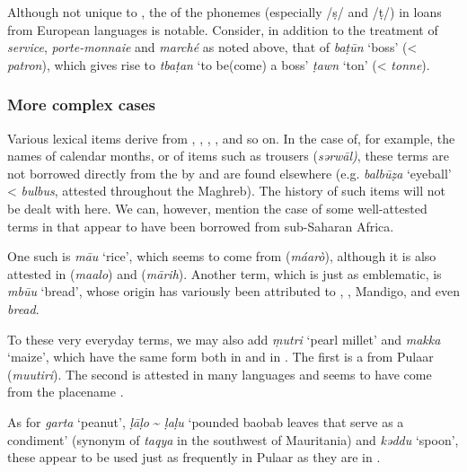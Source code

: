 \documentclass[output=paper]{langsci/langscibook}
\begin{document}
Although not unique to , the  of the  phonemes (especially /ṣ/ and /ṭ/) in loans from European languages is notable. Consider, in addition to the treatment of \textit{service}, \textit{porte-monnaie} and \textit{marché} as noted above, that of \textit{baṭ{\R}ūn} ‘boss’ (< \textit{patron}), which gives rise to \textit{tbaṭ{\R}an} ‘to be(come) a boss’ \textit{ṭawn} ‘ton’ (< \textit{tonne}).

\subsubsection{More complex cases} %

 \label{wander}

Various  lexical items derive from , , , , and so on. In the case of, for example, the names of calendar months, or of items such as trousers (\textit{sərwāl)}, these terms are not borrowed directly from the  by  and are found elsewhere (e.g. \textit{balbūẓa} ‘eyeball’ <  \textit{bulbus}, attested throughout the Maghreb). The history of such items will not be dealt with here. We can, however, mention the case of some well-attested terms in  that appear to have been borrowed from sub-Saharan Africa.

One such is \textit{mā{\R}u} ‘rice’, which seems to come from  (\textit{máarò}), although it is also attested in  (\textit{maalo}) and  (\textit{mārih}). Another term, which is just as emblematic, is \textit{mbū{\R}u} ‘bread’, whose origin has variously been attributed to , , Mandigo, and even  \textit{bread}.

To these very everyday terms, we may also add \textit{ṃutri} ‘pearl millet’ and \textit{makka} ‘maize’, which have the same form both in  and in . The first is a  from Pulaar (\textit{muutiri}). The second is attested in many languages and seems to have come from the placename . 

As for \textit{garta} ‘peanut’, \textit{ḷāḷo} \~{} \textit{ḷaḷu} ‘pounded baobab leaves that serve as a condiment’ (synonym of \textit{taqya} in the southwest of Mauritania) and \textit{kəddu} ‘spoon’, these appear to be used just as frequently in Pulaar as they are in . 
\end{document}
